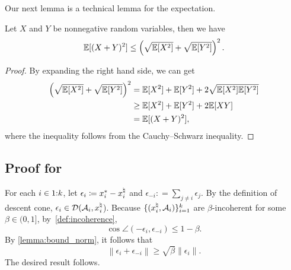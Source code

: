 Our next lemma is a technical lemma for the expectation.

\begin{lemma}\label{lemma:expectation}
    Let $X$ and $Y$ be nonnegative random variables, then we have 
    \[\mathbb{E}[(X+Y)^2] \leq \left( \sqrt{\mathbb{E}[X^2]} + \sqrt{\mathbb{E}[Y^2]} \right)^2.\]
\end{lemma}

\begin{proof}
    By expanding the right hand side, we can get
    \begin{align*}
      \left( \sqrt{\mathbb{E}[X^2]} + \sqrt{\mathbb{E}[Y^2]} \right)^2 &= \mathbb{E}[X^2] + \mathbb{E}[Y^2] + 2\sqrt{\mathbb{E}[X^2]\mathbb{E}[Y^2]}
      \\&\geq \mathbb{E}[X^2] + \mathbb{E}[Y^2] + 2\mathbb{E}[XY]
      \\&= \mathbb{E}[(X+Y)^2],
    \end{align*}
    where the inequality follows from the Cauchy–Schwarz inequality.
\end{proof}

\subsection{Proof for } \label{sec:proof-thm-stability}
For each $i\in1\mathord{:}k$, let $\epsilon_i \coloneqq  x_i^* - x_i^{\natural}$ and $\epsilon_{-i} : = \sum_{j \neq i}\epsilon_j$. By the definition of descent cone,
$\epsilon_i \in \mathcal{D}(\mathcal{A}_i, x_i^{\natural}$).
Because $\{(x_i^{\natural}, \mathcal{A}_i)\}_{i=1}^k$ are $\beta$-incoherent for some $\beta\in(0,1]$, by~\autoref{def:incoherence},
\[\cos\angle\left(-\epsilon_i, \epsilon_{-i}\right) \leq 1 - \beta.\]
By \autoref{lemma:bound_norm}, it follows that
\[ \left\|\epsilon_i + \epsilon_{-i}\right\| \geq \sqrt{\beta}\|\epsilon_i\|.\]
The desired result follows.

